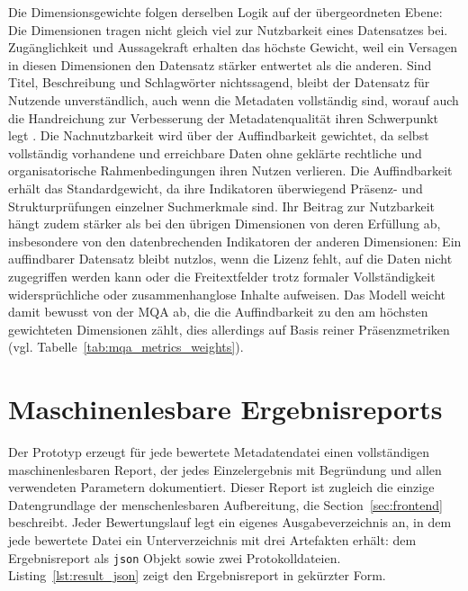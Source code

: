 Die Dimensionsgewichte folgen derselben Logik auf der übergeordneten Ebene: Die Dimensionen tragen nicht gleich viel zur Nutzbarkeit eines Datensatzes bei. Zugänglichkeit und Aussagekraft erhalten das höchste Gewicht, weil ein Versagen in diesen Dimensionen den Datensatz stärker entwertet als die anderen. Sind Titel, Beschreibung und Schlagwörter nichtssagend, bleibt der Datensatz für Nutzende unverständlich, auch wenn die Metadaten vollständig sind, worauf auch die Handreichung zur Verbesserung der Metadatenqualität ihren Schwerpunkt legt \cite{bydata2025handreichung}. Die Nachnutzbarkeit wird über der Auffindbarkeit gewichtet, da selbst vollständig vorhandene und erreichbare Daten ohne geklärte rechtliche und organisatorische Rahmenbedingungen ihren Nutzen verlieren. Die Auffindbarkeit erhält das Standardgewicht, da ihre Indikatoren überwiegend Präsenz- und Strukturprüfungen einzelner Suchmerkmale sind. Ihr Beitrag zur Nutzbarkeit hängt zudem stärker als bei den übrigen Dimensionen von deren Erfüllung ab, insbesondere von den datenbrechenden Indikatoren der anderen Dimensionen: Ein auffindbarer Datensatz bleibt nutzlos, wenn die Lizenz fehlt, auf die Daten nicht zugegriffen werden kann oder die Freitextfelder trotz formaler Vollständigkeit widersprüchliche oder zusammenhanglose Inhalte aufweisen. Das Modell weicht damit bewusst von der MQA ab, die die Auffindbarkeit zu den am höchsten gewichteten Dimensionen zählt, dies allerdings auf Basis reiner Präsenzmetriken (vgl. Tabelle~\ref{tab:mqa_metrics_weights}).

\section{Maschinenlesbare Ergebnisreports}
\label{sec:maschinenreport}

Der Prototyp erzeugt für jede bewertete Metadatendatei einen vollständigen maschinenlesbaren Report, der jedes Einzelergebnis mit Begründung und allen verwendeten Parametern dokumentiert. Dieser Report ist zugleich die einzige Datengrundlage der menschenlesbaren Aufbereitung, die Section~\ref{sec:frontend} beschreibt. Jeder Bewertungslauf legt ein eigenes Ausgabeverzeichnis an, in dem jede bewertete Datei ein Unterverzeichnis mit drei Artefakten erhält: dem Ergebnisreport als \texttt{json} Objekt sowie zwei Protokolldateien. Listing~\ref{lst:result_json} zeigt den Ergebnisreport in gekürzter Form.

